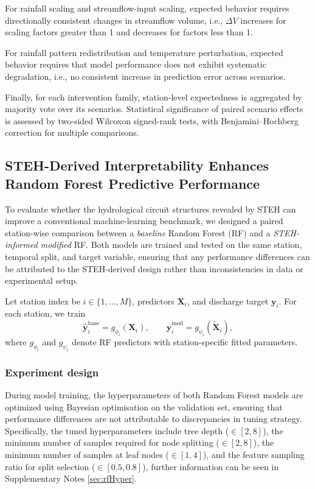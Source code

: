 \documentclass[11pt]{article}
\begin{document}
For rainfall scaling and streamflow-input scaling, expected behavior requires directionally consistent changes in streamflow volume, i.e., $\Delta V$ increases for scaling factors greater than 1 and decreases for factors less than 1\cite{nearing2021role}.

For rainfall pattern redistribution and temperature perturbation, expected behavior requires that model performance does not exhibit systematic degradation, i.e., no consistent increase in prediction error across scenarios\cite{hess-30-1077-2026}.

Finally, for each intervention family, station-level expectedness is aggregated by majority vote over its scenarios. Statistical significance of paired scenario effects is assessed by two-sided Wilcoxon signed-rank tests, with Benjamini--Hochberg correction for multiple comparisons.

\subsection{STEH-Derived Interpretability Enhances Random Forest Predictive Performance}
\label{sec:rfDesign}
To evaluate whether the hydrological circuit structures revealed by STEH can improve a conventional machine-learning benchmark, we designed a paired station-wise comparison between a \emph{baseline} Random Forest (RF) and a \emph{STEH-informed modified} RF\cite{hess-25-2997-2021}. Both models are trained and tested on the same station, temporal split, and target variable, ensuring that any performance differences can be attributed to the STEH-derived design rather than inconsistencies in data or experimental setup\cite{ABBASI2021125717}.

Let station index be $i\in\{1,\dots,M\}$, predictors $\mathbf{X}_i$, and discharge target $\mathbf{y}_i$. For each station, we train
\begin{equation}
    \hat{\mathbf{y}}^{\text{base}}_i = g_{\phi_i}(\mathbf{X}_i),
    \qquad
    \hat{\mathbf{y}}^{\text{mod}}_i = g_{\psi_i}(\widetilde{\mathbf{X}}_i),
\end{equation}
where $g_{\phi_i}$ and $g_{\psi_i}$ denote RF predictors with station-specific fitted parameters.

\subsubsection*{Experiment design}

During model training, the hyperparameters of both Random Forest models are optimized using Bayesian optimisation on the validation set\cite{BO_OPT}, ensuring that performance differences are not attributable to discrepancies in tuning strategy. Specifically, the tuned hyperparameters include tree depth ($\in [2, 8]$), the minimum number of samples required for node splitting ($\in [2, 8]$), the minimum number of samples at leaf nodes ($\in [1, 4]$), and the feature sampling ratio for split selection ($\in [0.5, 0.8]$), further information can be seen in Supplementary Notes \ref{sec:rfHyper}.
\end{document}
